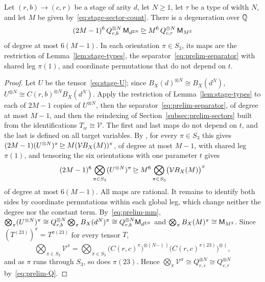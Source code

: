 \begin{proposition}\label{prop:stage}
Let \((r,b)\to(c,r)\) be a stage of arity \(d\), let \(N\ge1\), let
\(\tau\) be a type of width \(N\), and let \(M\) be given
by~\eqref{eq:stage-sector-count}. There is a degeneration over \(\mathbb Q\)
\begin{equation}\label{eq:stage-relation}
 (2M-1)^6\,Q_{r,b}^{\otimes N}\,\mathsf M_{d^{2N}}\unrhd M^6\,Q_{c,r}^{\otimes N}\,\mathsf M_{M^2}
\end{equation}
of degree at most \(6(M-1)\). In each orientation \(\pi\in S_3\), its maps
are the restriction of Lemma~\ref{lem:stage-types}, the
separator~\eqref{eq:prelim-separator} with shared leg \(\pi(1)\), and
coordinate permutations that do not depend on \(t\).
\end{proposition}

\begin{proof}
Let \(U\) be the tensor~\eqref{eq:stage-U}; since
\(B_X(d)^{\otimes N}\cong B_X(d^N)\),
\(U^{\otimes N}\cong C(r,b)^{\otimes N}B_X(d^N)\). Apply the restriction
of Lemma~\ref{lem:stage-types} to each of \(2M-1\) copies of
\(U^{\otimes N}\), then the separator~\eqref{eq:prelim-separator}, of
degree at most \(M-1\), and then the reindexing of
Section~\ref{subsec:prelim-sectors} built from the identifications
\(T_w\cong\mathcal V\). The first and last maps do not depend on \(t\),
and the last is defined on all target variables. By
\citep[Lemma~2.1]{FinCon26}, for every \(\pi\in S_3\) this gives
\((2M-1)(U^{\otimes N})^\pi\unrhd M(\mathcal VB_X(M))^\pi\), of degree at
most \(M-1\), with shared leg \(\pi(1)\), and tensoring the six
orientations with one parameter \(t\) gives
\[
 (2M-1)^6\bigotimes_{\pi\in S_3}(U^{\otimes N})^\pi
 \unrhd M^6\bigotimes_{\pi\in S_3}\bigl(\mathcal VB_X(M)\bigr)^\pi
\]
of degree at most \(6(M-1)\). All maps are rational. It remains to
identify both sides by coordinate permutations within each global leg,
which change neither the degree nor the constant term.
By~\eqref{eq:prelim-mm}, \(\bigotimes_\pi(U^{\otimes N})^\pi\cong
Q_{r,b}^{\otimes N}\bigotimes_\pi B_X(d^N)^\pi\cong Q_{r,b}^{\otimes N}\mathsf M_{d^{2N}}\)
and \(\bigotimes_\pi B_X(M)^\pi\cong\mathsf M_{M^2}\). Since
\((T^{(23)})^\pi=T^{\pi(23)}\) for every tensor \(T\),
\[
 \bigotimes_{\pi\in S_3}\mathcal V^\pi
 =\bigotimes_{\pi\in S_3}\bigl(C(r,c)^\pi\bigr)^{\otimes(N-\nmid)}
 \bigl(C(r,c)^{\pi(23)}\bigr)^{\otimes\nmid},
\]
and as \(\pi\) runs through \(S_3\), so does \(\pi(23)\). Hence
\(\bigotimes_\pi\mathcal V^\pi\cong Q_{r,c}^{\otimes N}\cong Q_{c,r}^{\otimes N}\)
by~\eqref{eq:prelim-Q}.
\end{proof}


